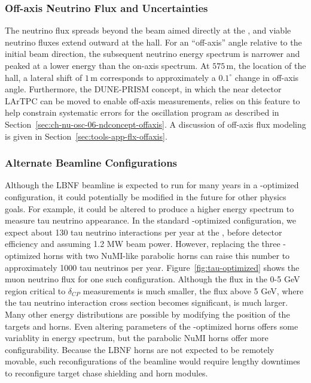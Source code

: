 \subsubsection{Off-axis Neutrino Flux and Uncertainties}

The neutrino flux spreads beyond the beam aimed directly at the , and viable neutrino fluxes extend outward at the  hall.  For an ``off-axis'' angle relative to the initial beam direction, the subsequent neutrino energy spectrum is narrower and peaked at a lower energy than the on-axis spectrum. At $575\,\textrm{m}$, the location of the  hall, a lateral shift of $1\,\textrm{m}$ corresponds to approximately a $0.1^\circ$ change in off-axis angle.  Furthermore, the DUNE-PRISM concept, in which the near detector LArTPC %
can be moved to enable  off-axis measurements, relies on this feature to help constrain systematic errors for the  oscillation program as described in Section~\ref{sec:ch-nu-osc-06-ndconcept-offaxis}. A discussion of off-axis flux modeling is given in %
Section~\ref{sec:tools-app-flx-offaxis}.



\subsubsection{Alternate Beamline Configurations}

Although the LBNF beamline is expected to run for many years in a -optimized configuration, it could potentially be modified in the future for other physics goals.  For example, it could be altered to produce a higher energy spectrum %
to measure tau neutrino appearance.  In the standard -optimized configuration, we expect about 130 tau neutrino  interactions per year %
at the , before detector efficiency and assuming 1.2 MW beam power.  However, replacing the three -optimized horns with two NuMI-like parabolic horns can raise this number to approximately 1000 tau neutrinos per year.  Figure~\ref{fig:tau-optimized} shows the muon neutrino flux for one such configuration.  Although the flux in the 0-5 GeV region critical to $\delta_{CP}$ measurements is much smaller, the flux above 5 GeV, where the tau neutrino interaction cross section becomes significant, is much larger.  Many other energy distributions are possible by modifying the position of the targets and horns.  Even altering parameters of the -optimized horns offers some variablity in energy spectrum, but the parabolic NuMI horns offer more configurability.  Because the LBNF horns are not expected to be remotely movable, such reconfigurations of the beamline would require lengthy downtimes to reconfigure target chase shielding and horn modules.   

